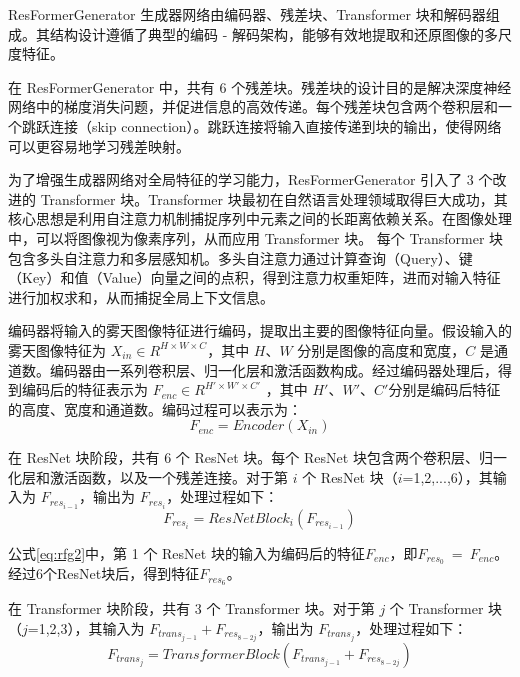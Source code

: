 ResFormerGenerator 生成器网络由编码器、残差块、Transformer 块和解码器组成。其结构设计遵循了典型的编码 - 解码架构，能够有效地提取和还原图像的多尺度特征。

在 ResFormerGenerator 中，共有 6 个残差块。残差块的设计目的是解决深度神经网络中的梯度消失问题，并促进信息的高效传递。每个残差块包含两个卷积层和一个跳跃连接（skip connection）。跳跃连接将输入直接传递到块的输出，使得网络可以更容易地学习残差映射。

为了增强生成器网络对全局特征的学习能力，ResFormerGenerator 引入了 3 个改进的 Transformer 块。Transformer 块最初在自然语言处理领域取得巨大成功，其核心思想是利用自注意力机制捕捉序列中元素之间的长距离依赖关系。在图像处理中，可以将图像视为像素序列，从而应用 Transformer 块。
每个 Transformer 块包含多头自注意力和多层感知机。多头自注意力通过计算查询（Query）、键（Key）和值（Value）向量之间的点积，得到注意力权重矩阵，进而对输入特征进行加权求和，从而捕捉全局上下文信息。

编码器将输入的雾天图像特征进行编码，提取出主要的图像特征向量。假设输入的雾天图像特征为 $X_{in} \in R^{H \times W \times C}$，其中 $H$、$W$ 分别是图像的高度和宽度，$C$ 是通道数。编码器由一系列卷积层、归一化层和激活函数构成。经过编码器处理后，得到编码后的特征表示为 $F_{enc} \in R^{H' \times W' \times C'}$ ，其中 $H'$、$W'$、$C'$分别是编码后特征的高度、宽度和通道数。编码过程可以表示为：
\begin{equation}
    \label{eq:rfg1}
    F_{enc} = Encoder(X_{in})
\end{equation}

在 ResNet 块阶段，共有 6 个 ResNet 块。每个 ResNet 块包含两个卷积层、归一化层和激活函数，以及一个残差连接。对于第 $i$ 个 ResNet 块（$i$=1,2,...,6），其输入为 $F_{res_{i-1}}$，输出为 $F_{res_{i}}$ ​，处理过程如下：
\begin{equation}
    \label{eq:rfg2}
    F_{res_{i}} = ResNetBlock_i(F_{res_{i-1}})
\end{equation}

公式\ref{eq:rfg2}中，第 1 个 ResNet 块的输入为编码后的特征$F_{enc}$，即$F_{res_{0}}\ =\ F_{enc}$。经过6个ResNet块后，得到特征$F_{res_{6}}$。

在 Transformer 块阶段，共有 3 个 Transformer 块。对于第 $j$ 个 Transformer 块（$j$=1,2,3），其输入为 $F_{trans_{j-1}} + F_{res_{8-2j}}$，输出为 $F_{trans_{j}}$ ​，处理过程如下：
\begin{equation}
    \label{eq:rfg3}
    F_{trans_j} = TransformerBlock(F_{trans_{j-1}} + F_{res_{8-2j}}) 
\end{equation}

